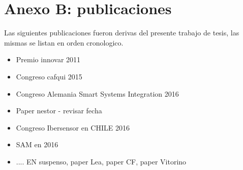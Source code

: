 \cleardoublepage{}
{}
\FormatoAnexo

\RemoveLabelsAxUno

\AddLabelsAxDos

\chapter*{Anexo B: publicaciones}

  \noindent Las siguientes publicaciones fueron derivas del presente trabajo de tesis, las mismas se listan en orden cronologico.

  \begin{itemize}
  	
  	\item Premio innovar 2011
    
    \item Congreso cafqui 2015
    
    \item Congreso Alemania Smart Systems Integration 2016
    
    \item Paper nestor - revisar fecha

    \item Congreso Ibersensor en CHILE 2016
    
    \item SAM en 2016
    
    \item .... EN suspenso, paper Lea, paper CF, paper Vitorino

  \end{itemize}	

\thispagestyle{backmatter}